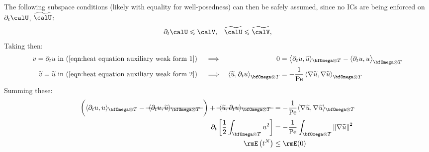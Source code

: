     The following subspace conditions (likely with equality for well-posedness) can then be safely assumed, since no ICs are being enforced on $\partial_{t}\calU$, $\widetilde{\calU}$:
    \begin{align}
        \partial_{t}\calU  \leqslant  \calV,  &&
        \widetilde{\calU}  \leqslant  \widetilde{\calV},  
    \end{align}
    Taking then:
    \begin{align}
        v  =  \partial_{t}u &\text{ in (\ref{eqn:heat equation auxiliary weak form 1})}  &&\implies  &  0  &=  \left\langle\partial_{t}u, \widetilde{u}\rangle_{\bfOmega\otimes T} - \langle\partial_{t}u, u\right\rangle_{\bfOmega\otimes T}  \\
        \widetilde{v}  = \widetilde{u} &\text{ in (\ref{eqn:heat equation auxiliary weak form 2})}  &&\implies  &  \left\langle\widetilde{u}, \partial_{t}u\right\rangle_{\bfOmega\otimes T}  &=  - \frac{1}{\rmPe}\left\langle\nabla\widetilde{u}, \nabla\widetilde{u}\right\rangle_{\bfOmega\otimes T}
    \end{align}
    Summing these:
    \begin{align}
        \left(\langle\partial_{t}u, u\rangle_{\bfOmega\otimes T} - \text{\sout{ $\langle\partial_{t}u, \widetilde{u}\rangle_{\bfOmega\otimes T}$ }}\tall\right) + \text{\sout{ $\langle\widetilde{u}, \partial_{t}u\rangle_{\bfOmega\otimes T}$ }} 
         &=  - \frac{1}{\rmPe}\langle\nabla\widetilde{u}, \nabla\widetilde{u}\rangle_{\bfOmega\otimes T}  \\
         \partial_{t}\left[\frac{1}{2}\int_{\bfOmega\otimes T}u^{2}\right]  &=  - \frac{1}{\rmPe}\int_{\bfOmega\otimes T}\left\|\nabla\widetilde{u}\right\|^{2}  \\
         \rmE\left(t^{N}\right)  &\leq  \rmE(0)
    \end{align}
    
